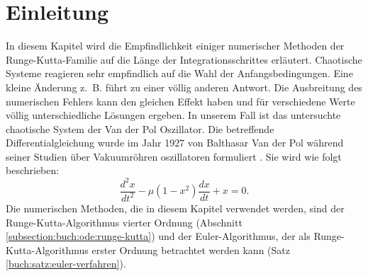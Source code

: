 %
%
%
\section{Einleitung\label{vanderpol:section:einleitung}}
In diesem Kapitel wird die Empfindlichkeit einiger numerischer Methoden der Runge-Kutta-Familie auf die Länge der Integrationsschrittes erläutert.
Chaotische Systeme reagieren sehr empfindlich auf die Wahl der Anfangsbedingungen. Eine kleine Änderung z.~B. führt zu einer völlig anderen Antwort.
Die Ausbreitung des numerischen Fehlers kann den gleichen Effekt haben und für verschiedene Werte völlig unterschiedliche Lösungen ergeben.
In unserem Fall ist das untersuchte chaotische System der Van der Pol Oszillator.
Die betreffende Differentialgleichung wurde im Jahr 1927 von Balthasar Van der Pol während seiner Studien über Vakuumröhren oszillatoren formuliert \cite{vanderpol:bibvdp}.
Sie wird wie folgt beschrieben:
\begin{equation}
\frac{d^{2}x}{dt^{2}} - \mu (1 - x^{2}) \frac{dx}{dt} + x = 0.
\label{vanderpol:equations:vdp}
\end{equation}
Die numerischen Methoden, die in diesem Kapitel verwendet werden, sind der Runge-Kutta-Algorithmus vierter Ordnung (Abschnitt \ref{subsection:buch:ode:runge-kutta}) und der Euler-Algorithmus, der als Runge-Kutta-Algorithmus erster Ordnung betrachtet werden kann (Satz \ref{buch:satz:euler-verfahren}).

